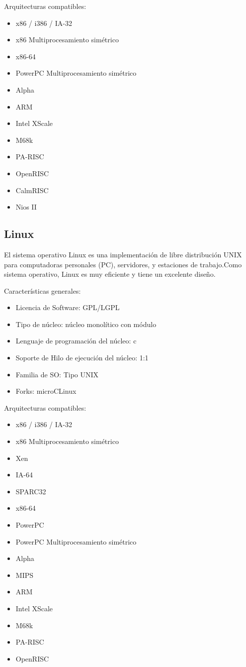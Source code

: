 Arquitecturas compatibles:

				\begin{itemize}
				\item x86 / i386 / IA-32
				\item x86 Multiprocesamiento simétrico
				\item x86-64
				\item PowerPC Multiprocesamiento simétrico
				\item Alpha
				\item ARM
				\item Intel XScale
				\item M68k
				\item PA-RISC
				\item OpenRISC
				\item CalmRISC
				\item Nios II
			\end{itemize}			

	

			 \subsection{Linux}

El sistema operativo Linux es una implementación de libre distribución UNIX para computadoras personales (PC), servidores, y estaciones de trabajo.Como sistema operativo, Linux es muy eficiente y tiene un excelente diseño.

 
Características generales:

	\begin{itemize}
	\item Licencia de Software: GPL/LGPL
	\item Tipo de núcleo: núcleo monolítico con módulo
	\item Lenguaje de programación del núcleo: c
	\item Soporte de Hilo de ejecución del núcleo: 1:1
	\item Familia de SO: Tipo UNIX
	\item Forks: microCLinux	
	\end{itemize}			

Arquitecturas compatibles:

				\begin{itemize}
				\item x86 / i386 / IA-32
				\item x86 Multiprocesamiento simétrico
				\item Xen
				\item IA-64 	
				\item SPARC32
				\item x86-64
				\item PowerPC
				\item PowerPC Multiprocesamiento simétrico
				\item Alpha
				\item MIPS
				\item ARM
				\item Intel XScale
				\item M68k
				\item PA-RISC
				\item OpenRISC
			\end{itemize}			

